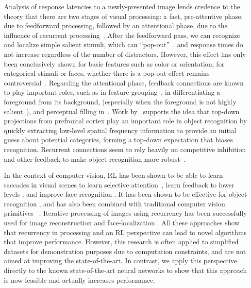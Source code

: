 Analysis of response latencies to a newly-presented image lends
credence to the theory that there are two stages of visual processing:
a fast, pre-attentive phase, due to feedforward processing, followed
by an attentional phase, due to the influence of recurrent
processing~\cite{lamme2000distinct}.  After the feedforward pass, we
can recognize and localize simple salient stimuli, which can
``pop-out''~\cite{Itti:2007}, and response times do not increase
regardless of the number of distractors.  However, this effect has
only been conclusively shown for basic features such as color or
orientation; for categorical stimuli or faces, whether there is a
pop-out effect remains
controversial~\cite{francolini1979perceptual,vanrullen2006second}.
Regarding the attentional phase, feedback connections are known to
play important roles, such as in feature
grouping~\cite{gilbert2007brain}, in differentiating a foreground from
its background, (especially when the foreground is not highly
salient~\cite{hupe1998cortical,bullier2001role}), and perceptual
filling in~\cite{lamme2001blindsight}. Work by~\citet{bar2006top}
supports the idea that top-down projections from prefrontal cortex
play an important role in object recognition by quickly extracting
low-level spatial frequency information to provide an initial guess
about potential categories, forming a top-down expectation that biases
recognition.  Recurrent connections seem to rely heavily on
competitive inhibition and other feedback to make object recognition
more robust~\cite{wyatte2012, wyatte2012b}.

In the context of computer vision, RL has been shown to be able to
learn saccades in visual scenes to learn selective
attention~\cite{SchmidhuberHuber:91}, learn feedback to lower levels
\cite{oreilly1996, fukushima2003}, and improve face recognition
\cite{larochelle2010learning,goodrich2012reinforcement,stollenga2011using}.
It has been shown to be effective for object recognition
\cite{oreilly2013}, and has also been combined with traditional
computer vision primitives ~\cite{Whitehead:92}. Iterative processing
of images using recurrency has been successfully used for image reconstruction
\cite{behnke2001learning} and face-localization \cite{behnke2005face}.
All these approaches show that recurrency in processing and an RL perspective can lead to
novel algorithms that improve performance.  However, this research is
often applied to simplified datasets for demonstration purposes due to
computation constraints, and are not aimed at improving the
state-of-the-art.  In contrast, we apply this perspective directly to
the known state-of-the-art neural networks to show that this approach
is now feasible and actually increases performance.

